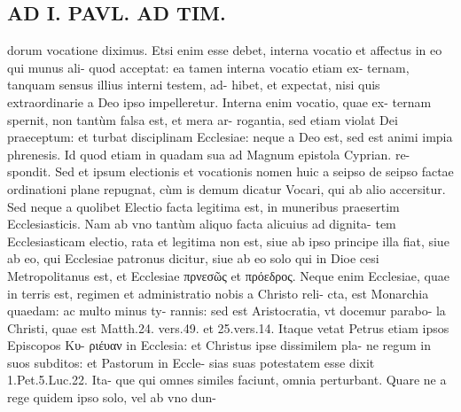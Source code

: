 \documentclass{article}
\begin{document}
\begin{pages}
\section*{AD I. PAVL. AD TIM. }
\marginpar{[ p.340 ]}\pstart dorum vocatione diximus. Etsi enim esse debet, interna vocatio et affectus in eo qui munus ali- quod acceptat: ea tamen interna vocatio etiam ex- ternam, tanquam sensus illius interni testem, ad- hibet, et expectat, nisi quis extraordinarie a Deo ipso impelleretur. Interna enim vocatio, quae ex- ternam spernit, non tantùm falsa est, et mera ar- rogantia, sed etiam violat Dei praeceptum: et turbat disciplinam Ecclesiae: neque a Deo est, sed est animi impia phrenesis. Id quod etiam in quadam sua ad Magnum epistola Cyprian. re- spondit. Sed et ipsum electionis et vocationis nomen huic a seipso de seipso factae ordinationi plane repugnat, cùm is demum dicatur Vocari, qui ab alio accersitur.  \pend\pstart Sed neque a quolibet Electio facta legitima est, in muneribus praesertim Ecclesiasticis. Nam ab vno tantùm aliquo facta alicuius ad dignita- tem Ecclesiasticam electio, rata et legitima non est, siue ab ipso principe illa fiat, siue ab eo, qui Ecclesiae patronus dicitur, siue ab eo solo qui in Dioe cesi Metropolitanus est, et Ecclesiae πρνεσῶς et πρόεδρος. Neque  enim Ecclesiae, quae in terris est, regimen et administratio nobis a Christo reli- cta, est Monarchia quaedam: ac multo minus ty- rannis: sed est Aristocratia, vt docemur parabo- la Christi, quae est Matth.24. vers.49. et 25.vers.14. Itaque vetat Petrus etiam ipsos Episcopos Kυ- ριέυαν in Ecclesia: et Christus ipse dissimilem pla- ne regum in suos subditos: et Pastorum in Eccle- sias suas potestatem esse dixit 1.Pet.5.Luc.22. Ita- que qui omnes similes faciunt, omnia perturbant. Quare ne a rege quidem ipso solo, vel ab vno dun-  \pend

\end{pages}
\end{document}
